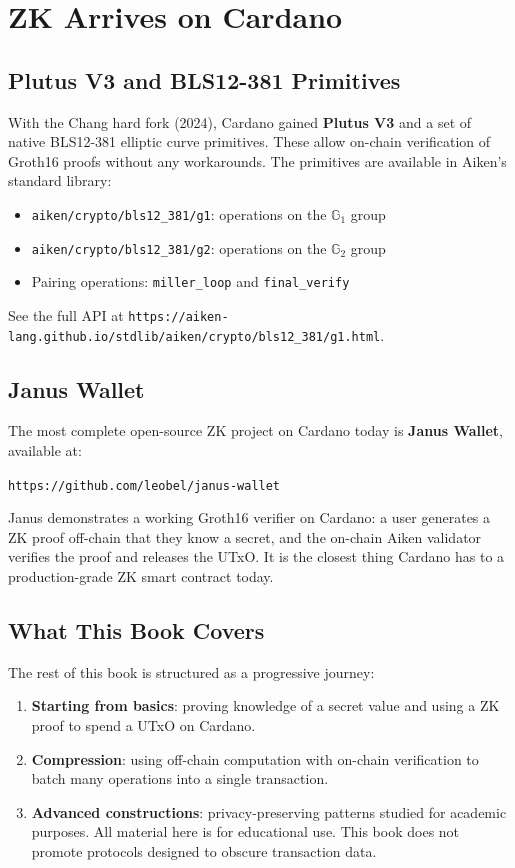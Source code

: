 \section{ZK Arrives on Cardano}

\subsection*{Plutus V3 and BLS12-381 Primitives}

With the Chang hard fork (2024), Cardano gained \textbf{Plutus V3} and a set of native BLS12-381 elliptic curve primitives. These allow on-chain verification of Groth16 proofs without any workarounds. The primitives are available in Aiken's standard library:

\begin{itemize}
  \item \texttt{aiken/crypto/bls12\_381/g1}: operations on the $\mathbb{G}_1$ group
  \item \texttt{aiken/crypto/bls12\_381/g2}: operations on the $\mathbb{G}_2$ group
  \item Pairing operations: \texttt{miller\_loop} and \texttt{final\_verify}
\end{itemize}

See the full API at \texttt{https://aiken-lang.github.io/stdlib/aiken/crypto/bls12\_381/g1.html}.

\subsection*{Janus Wallet}

The most complete open-source ZK project on Cardano today is \textbf{Janus Wallet}, available at:

\begin{center}
  \texttt{https://github.com/leobel/janus-wallet}
\end{center}

Janus demonstrates a working Groth16 verifier on Cardano: a user generates a ZK proof off-chain that they know a secret, and the on-chain Aiken validator verifies the proof and releases the UTxO. It is the closest thing Cardano has to a production-grade ZK smart contract today.

\subsection*{What This Book Covers}

The rest of this book is structured as a progressive journey:

\begin{enumerate}
  \item \textbf{Starting from basics}: proving knowledge of a secret value and using a ZK proof to spend a UTxO on Cardano.
  \item \textbf{Compression}: using off-chain computation with on-chain verification to batch many operations into a single transaction.
  \item \textbf{Advanced constructions}: privacy-preserving patterns studied for academic purposes. All material here is for educational use. This book does not promote protocols designed to obscure transaction data.
\end{enumerate}

